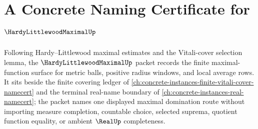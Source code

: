 \chapter{A Concrete Naming Certificate for $\HardyLittlewoodMaximalUp$}
\label{ch:concrete-instances-hardy-littlewood-maximal-namecert}

Following Hardy--Littlewood maximal estimates and the Vitali-cover selection lemma, the $\HardyLittlewoodMaximalUp$ packet records the finite maximal-function surface for metric balls, positive radius windows, and local average rows. It sits beside the finite covering ledger of \autoref{ch:concrete-instances-finite-vitali-cover-namecert} and the terminal real-name boundary of \autoref{ch:concrete-instances-real-namecert}; the packet names one displayed maximal domination route without importing measure completion, countable choice, selected suprema, quotient function equality, or ambient $\RealUp$ completeness.

